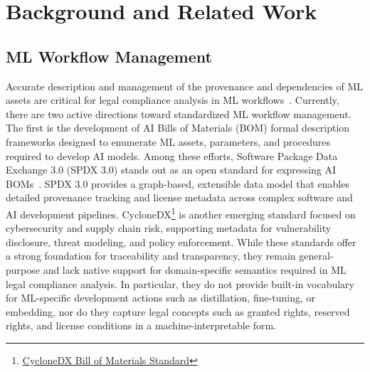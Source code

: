 \section{Background and Related Work}
\label{sec:related}

\subsection{ML Workflow Management}
Accurate description and management of the provenance and dependencies of ML assets are critical for legal compliance analysis in ML workflows~\cite{wang2025ml}. 
Currently, there are two active directions toward standardized ML workflow management. 
The first is the development of AI Bills of Materials (BOM) formal description frameworks designed to enumerate ML assets, parameters, and procedures required to develop AI models.
Among these efforts, Software Package Data Exchange 3.0 (SPDX 3.0) stands out as an open standard for expressing AI BOMs~\cite{karen2024implementing}. 
SPDX 3.0 provides a graph-based, extensible data model that enables detailed provenance tracking and license metadata across complex software and AI development pipelines.
CycloneDX\footnote{\href{https://cyclonedx.org/}{CycloneDX Bill of Materials Standard}} is another emerging standard focused on cybersecurity and supply chain risk, supporting metadata for vulnerability disclosure, threat modeling, and policy enforcement.
While these standards offer a strong foundation for traceability and transparency, they remain general-purpose and lack native support for domain-specific semantics required in ML legal compliance analysis. 
In particular, they do not provide built-in vocabulary for ML-specific development actions such as distillation, fine-tuning, or embedding, nor do they capture legal concepts such as granted rights, reserved rights, and license conditions in a machine-interpretable form.

